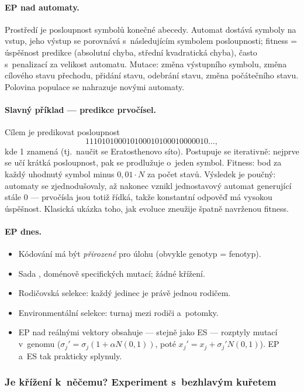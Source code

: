 \documentclass[11pt,a4paper]{article}
\theoremstyle{definition}
\begin{document}
\paragraph{EP nad automaty.} Prostředí je posloupnost symbolů konečné abecedy.
Automat dostává symboly na vstup, jeho výstup se porovnává s~následujícím
symbolem posloupnosti; fitness = úspěšnost predikce (absolutní chyba, střední
kvadratická chyba), často s~penalizací za velikost automatu.
Mutace: změna výstupního symbolu, změna cílového stavu přechodu, přidání
stavu, odebrání stavu, změna počátečního stavu. Polovina populace se nahrazuje
novými automaty.

\paragraph{Slavný příklad --- predikce prvočísel.} Cílem je predikovat
posloupnost
\[
111010100010100010100010000010\ldots,
\]
kde 1 znamená  (tj.\ naučit se Eratosthenovo
síto). Postupuje se iterativně: nejprve se učí krátká posloupnost, pak se
prodlužuje o~jeden symbol. Fitness: bod za každý uhodnutý symbol minus
$0{,}01 \cdot N$ za počet stavů. Výsledek je poučný: automaty se
zjednodušovaly, až nakonec vznikl jednostavový automat generující stále 0 ---
prvočísla jsou totiž řídká, takže konstantní odpověď  má
vysokou úspěšnost. Klasická ukázka toho, jak evoluce zneužije špatně
navrženou fitness.

\paragraph{EP dnes.}
\begin{itemize}
\item Kódování má být \emph{přirozené} pro úlohu (obvykle genotyp = fenotyp).
\item Sada , doménově specifických mutací; žádné křížení.
\item Rodičovská selekce: každý jedinec je právě jednou rodičem.
\item Environmentální selekce: turnaj mezi rodiči a~potomky.
\item EP nad reálnými vektory obsahuje --- stejně jako ES --- rozptyly mutací
  v~genomu ($\sigma_j' = \sigma_j(1 + \alpha N(0,1))$, poté
  $x_j' = x_j + \sigma_j' N(0,1)$). EP a~ES tak prakticky splynuly.
\end{itemize}

\subsubsection{Je křížení k~něčemu? Experiment s~bezhlavým kuřetem}
\end{document}
